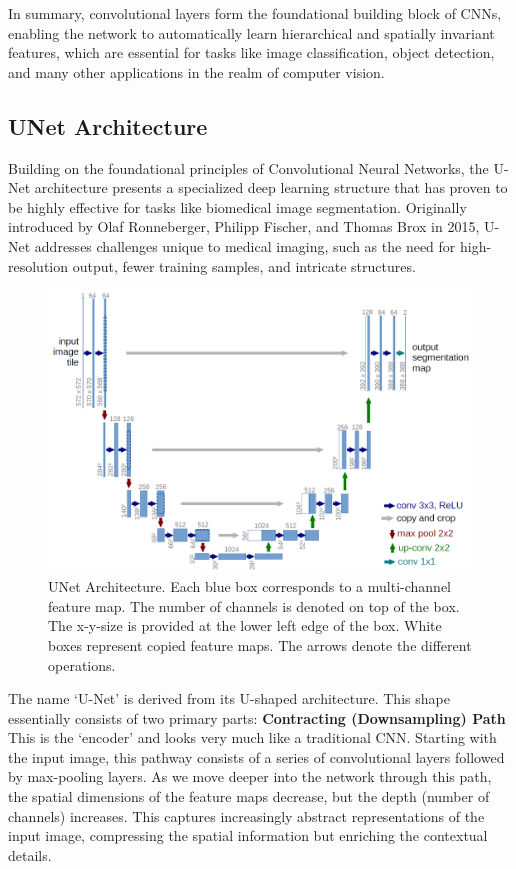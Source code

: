 In summary, convolutional layers form the foundational building block of CNNs, enabling the network to automatically learn hierarchical and spatially invariant features,
which are essential for tasks like image classification, object detection, and many other applications in the realm of computer vision.

\subsection{UNet Architecture}
Building on the foundational principles of Convolutional Neural Networks,
the U-Net architecture presents a specialized deep learning structure that has proven to be highly effective for tasks like biomedical image segmentation.
Originally introduced by Olaf Ronneberger, Philipp Fischer, and Thomas Brox in 2015\cite{ronneberger_u-net_2015}, U-Net addresses challenges unique to medical imaging, such as the need for high-resolution output,
fewer training samples, and intricate structures.

\begin{figure}[!hb]
	\centering
	\includegraphics[width=0.8\linewidth]{images/UNet-Architecture}
	\caption{UNet Architecture. Each blue
	box corresponds to a multi-channel feature map. The number of channels is denoted
	on top of the box. The x-y-size is provided at the lower left edge of the box. White
	boxes represent copied feature maps. The arrows denote the different operations.\cite[2]{ronneberger_u-net_2015}}
	\label{fig:UNet}
\end{figure}

\noindent The name `U-Net' is derived from its U-shaped architecture.
This shape essentially consists of two primary parts:
\newpage
\noindent\textbf{Contracting (Downsampling) Path}\\
This is the `encoder' and looks very much like a traditional CNN.
Starting with the input image, this pathway consists of a series of convolutional layers followed by max-pooling layers.
As we move deeper into the network through this path,
the spatial dimensions of the feature maps decrease, but the depth (number of channels) increases.
This captures increasingly abstract representations of the input image,
compressing the spatial information but enriching the contextual details.

